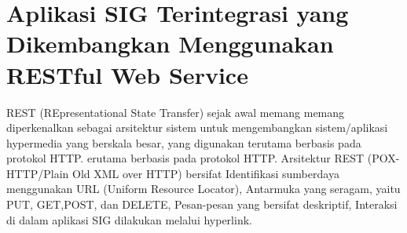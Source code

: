 \section{Aplikasi SIG Terintegrasi yang Dikembangkan Menggunakan RESTful Web Service}
REST (REpresentational State Transfer) sejak awal memang memang diperkenalkan sebagai arsitektur sistem untuk mengembangkan sistem/aplikasi hypermedia yang berskala besar, yang digunakan terutama berbasis pada protokol HTTP. erutama berbasis pada protokol HTTP. Arsitektur REST (POX-HTTP/Plain Old XML over HTTP) bersifat Identifikasi sumberdaya menggunakan URL
(Uniform Resource Locator), Antarmuka yang seragam, yaitu PUT, GET,POST, dan DELETE, Pesan-pesan yang bersifat deskriptif, Interaksi di dalam aplikasi SIG dilakukan melalui hyperlink.

